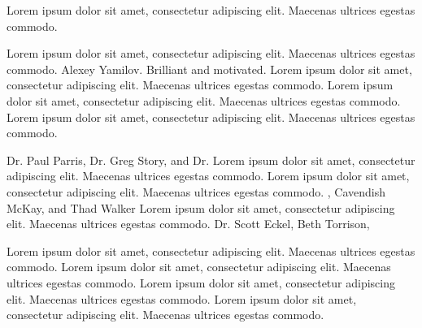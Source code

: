 
Lorem ipsum dolor sit amet, consectetur adipiscing elit. Maecenas ultrices egestas commodo. 

Lorem ipsum dolor sit amet, consectetur adipiscing elit. Maecenas ultrices egestas commodo. Alexey Yamilov. Brilliant and motivated. Lorem ipsum dolor sit amet, consectetur adipiscing elit. Maecenas ultrices egestas commodo. Lorem ipsum dolor sit amet, consectetur adipiscing elit. Maecenas ultrices egestas commodo. Lorem ipsum dolor sit amet, consectetur adipiscing elit. Maecenas ultrices egestas commodo.


Dr. Paul Parris, Dr. Greg Story, and Dr. Lorem ipsum dolor sit amet, consectetur adipiscing elit. Maecenas ultrices egestas commodo. 
Lorem ipsum dolor sit amet, consectetur adipiscing elit. Maecenas ultrices egestas commodo. 
, Cavendish McKay, and %
 Thad Walker %
Lorem ipsum dolor sit amet, consectetur adipiscing elit. Maecenas ultrices egestas commodo. 
Dr. Scott Eckel, %
Beth Torrison, %

Lorem ipsum dolor sit amet, consectetur adipiscing elit. Maecenas ultrices egestas commodo. Lorem ipsum dolor sit amet, consectetur adipiscing elit. Maecenas ultrices egestas commodo.
Lorem ipsum dolor sit amet, consectetur adipiscing elit. Maecenas ultrices egestas commodo.
Lorem ipsum dolor sit amet, consectetur adipiscing elit. Maecenas ultrices egestas commodo.
